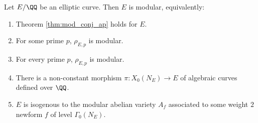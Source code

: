 \begin{theorem}\label{equivs_modular}
	Let $E/\QQ$ be an elliptic curve. Then $E$ is modular, equivalently:
	\begin{enumerate}
		\item Theorem \ref{thm:mod_conj_ap} holds for $E$.
		\item For some prime $p$, $\rho_{E,p}$ is modular.
		\item For every prime $p$, $\rho_{E,p}$ is modular.
		\item There is a non-constant morphism $\pi : X_0(N_E) \to E$ of algebraic curves defined over $\QQ$.
		\item $E$ is isogenous to the modular abelian variety $A_f$ associated to some weight $2$ newform $f$ of level $\Gamma_0(N_E)$.
		
	\end{enumerate}
	
	

\end{theorem}	



